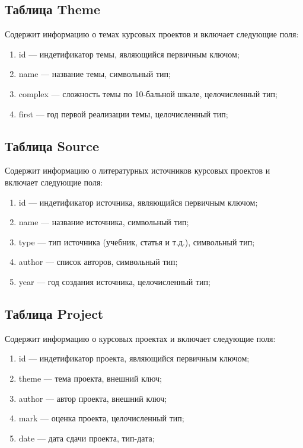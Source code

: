 \subsection*{Таблица Theme}

Содержит информацию о темах курсовых проектов и включает следующие поля:

\begin{enumerate}
	\item id --- индетификатор темы, являющийся первичным ключом;
	\item name --- название темы, символьный тип;
	\item complex --- сложность темы по 10-бальной шкале, целочисленный тип;
	\item first --- год первой реализации темы, целочисленный тип;
\end{enumerate}

\subsection*{Таблица Source}

Содержит информацию о литературных источников курсовых проектов и включает следующие поля:

\begin{enumerate}
	\item id --- индетификатор источника, являющийся первичным ключом;
	\item name --- название источника, символьный тип;
	\item type --- тип источника (учебник, статья и т.д.), символьный тип;
	\item author --- список авторов, символьный тип;
	\item year --- год создания источника, целочисленный тип;
\end{enumerate}

\subsection*{Таблица Project}

Содержит информацию о курсовых проектах и включает следующие поля:

\begin{enumerate}
	\item id --- индетификатор проекта, являющийся первичным ключом;
	\item theme --- тема проекта, внешний ключ;
	\item author --- автор проекта, внешний ключ;
	\item mark --- оценка проекта, целочисленный тип;
	\item date --- дата сдачи проекта, тип-дата;
\end{enumerate}


